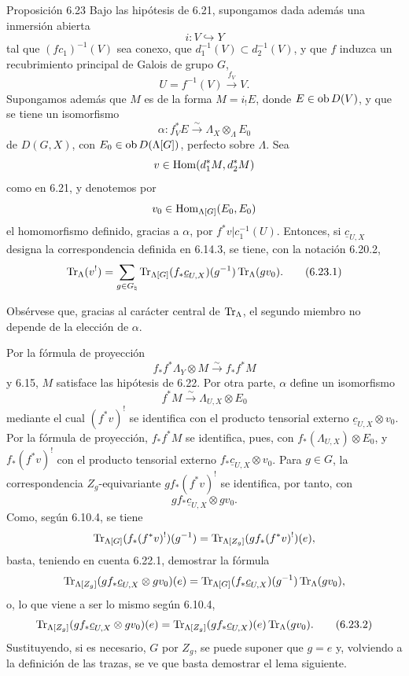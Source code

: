 \begin{statement}{Proposición 6.23}
Bajo las hipótesis de 6.21, supongamos dada además una inmersión abierta
\[
i:V\hookrightarrow Y
\]
tal que $(fc_1)^{-1}(V)$ sea conexo, que $d_1^{-1}(V)\subset d_2^{-1}(V)$, y que $f$ induzca un recubrimiento principal de Galois de grupo $G$,
\[
U=f^{-1}(V)\xrightarrow{f_V}V.
\]
Supongamos además que $M$ es de la forma $M=i_!E$, donde $E\in\operatorname{ob} D(V)$, y que se tiene un isomorfismo
\[
\alpha:f_V^*E\xrightarrow{\sim}\Lambda_X\otimes_{\Lambda}E_0
\]
de $D(G,X)$, con $E_0\in\operatorname{ob} D(\Lambda[G])$, perfecto sobre $\Lambda$. Sea
\[
v\in\operatorname{Hom}(d_1^*M,d_2^*M)
\]
como en 6.21, y denotemos por
\[
v_0\in\operatorname{Hom}_{\Lambda[G]}(E_0,E_0)
\]
el homomorfismo definido, gracias a $\alpha$, por $f^*v|c_1^{-1}(U)$. Entonces, si $\underline c_{U,X}$ designa la correspondencia definida en 6.14.3, se tiene, con la notación 6.20.2,
\begin{equation}
\operatorname{Tr}_{\Lambda}(v^!)
=
\sum_{g\in G_{\natural}}
\operatorname{Tr}_{\Lambda[G]}(f_*\underline c_{U,X})(g^{-1})\operatorname{Tr}_{\Lambda}(gv_0).
\tag{6.23.1}
\end{equation}
\end{statement}

Obsérvese que, gracias al carácter central de $\operatorname{Tr}_{\Lambda}$, el segundo miembro no depende de la elección de $\alpha$.

Por la fórmula de proyección
\[
f_*f^*\Lambda_Y\otimes M\xrightarrow{\sim}f_*f^*M
\]
y 6.15, $M$ satisface las hipótesis de 6.22. Por otra parte, $\alpha$ define un isomorfismo
\[
f^*M\xrightarrow{\sim}\Lambda_{U,X}\otimes E_0
\]
mediante el cual $(f^*v)^!$ se identifica con el producto tensorial externo $\underline c_{U,X}\otimes v_0$. Por la fórmula de proyección, $f_*f^*M$ se identifica, pues, con $f_*(\Lambda_{U,X})\otimes E_0$, y $f_*(f^*v)^!$ con el producto tensorial externo $f_*\underline c_{U,X}\otimes v_0$. Para $g\in G$, la correspondencia $Z_g$-equivariante $gf_*(f^*v)^!$ se identifica, por tanto, con
\[
gf_*\underline c_{U,X}\otimes gv_0.
\]
Como, según 6.10.4, se tiene
\[
\operatorname{Tr}_{\Lambda[G]}(f_*(f^*v)^!)(g^{-1})
=
\operatorname{Tr}_{\Lambda[Z_g]}(gf_*(f^*v)^!)(e),
\]
basta, teniendo en cuenta 6.22.1, demostrar la fórmula
\[
\operatorname{Tr}_{\Lambda[Z_g]}(gf_*\underline c_{U,X}\otimes gv_0)(e)
=
\operatorname{Tr}_{\Lambda[G]}(f_*\underline c_{U,X})(g^{-1})\operatorname{Tr}_{\Lambda}(gv_0),
\]
o, lo que viene a ser lo mismo según 6.10.4,
\begin{equation}
\operatorname{Tr}_{\Lambda[Z_g]}(gf_*\underline c_{U,X}\otimes gv_0)(e)
=
\operatorname{Tr}_{\Lambda[Z_g]}(gf_*\underline c_{U,X})(e)\operatorname{Tr}_{\Lambda}(gv_0).
\tag{6.23.2}
\end{equation}
Sustituyendo, si es necesario, $G$ por $Z_g$, se puede suponer que $g=e$ y, volviendo a la definición de las trazas, se ve que basta demostrar el lema siguiente.
